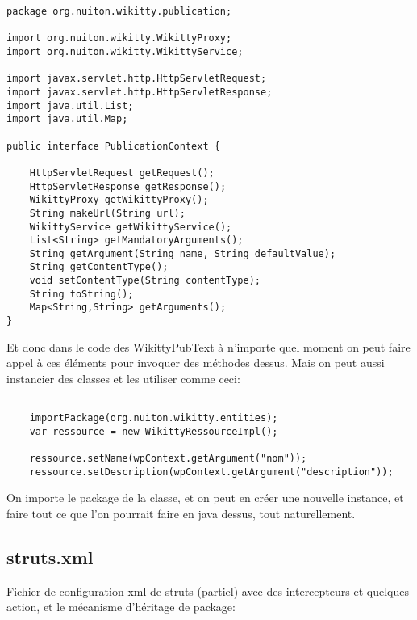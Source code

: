 \begin{lstlisting}
package org.nuiton.wikitty.publication;

import org.nuiton.wikitty.WikittyProxy;
import org.nuiton.wikitty.WikittyService;

import javax.servlet.http.HttpServletRequest;
import javax.servlet.http.HttpServletResponse;
import java.util.List;
import java.util.Map;

public interface PublicationContext {

    HttpServletRequest getRequest();
    HttpServletResponse getResponse();
    WikittyProxy getWikittyProxy();
    String makeUrl(String url);
    WikittyService getWikittyService();
    List<String> getMandatoryArguments();
    String getArgument(String name, String defaultValue);
    String getContentType();
    void setContentType(String contentType);
    String toString();
    Map<String,String> getArguments();
}

\end{lstlisting}

Et donc dans le code des WikittyPubText à n'importe quel moment on peut faire 
appel à ces éléments pour invoquer des méthodes dessus. Mais on peut aussi
instancier des classes et les utiliser comme ceci:

\begin{lstlisting}

	importPackage(org.nuiton.wikitty.entities);
	var ressource = new WikittyRessourceImpl();

	ressource.setName(wpContext.getArgument("nom"));
	ressource.setDescription(wpContext.getArgument("description"));
\end{lstlisting}

On importe le package de la classe, et on peut en créer une nouvelle instance, 
et faire tout ce que l'on pourrait faire en java dessus, tout naturellement.
\clearpage

\subsection*{struts.xml}

Fichier de configuration xml de struts (partiel) avec des intercepteurs et quelques
action, et le mécanisme d'héritage de package:

